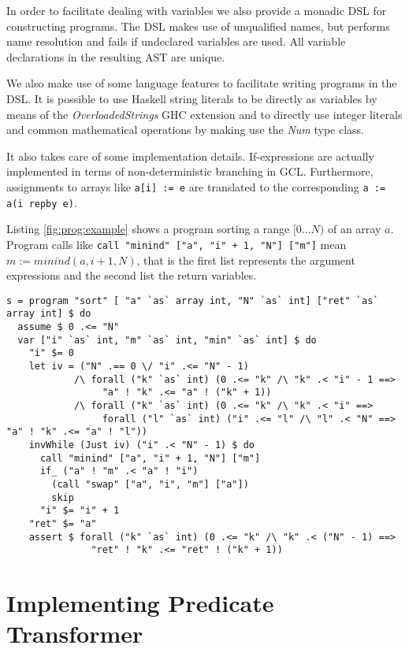 \documentclass[]{scrartcl}
\begin{document}
In order to facilitate dealing with variables we also provide a monadic DSL for constructing programs.
The DSL makes use of unqualified names, but performs name resolution and fails if undeclared variables
are used. All variable declarations in the resulting AST are unique.

We also make use of some language features to facilitate writing programs in the DSL.
It is possible to use Haskell string literals to be directly as variables by means of the
\emph{OverloadedStrings} GHC extension and to directly use integer literals and common mathematical
operations by making use the \emph{Num} type class.

It also takes care of some implementation details. If-expressions are actually implemented in terms of
non-deterministic branching in GCL. Furthermore, assignments to arrays like
\lstinline|a[i] := e| are translated to the corresponding \lstinline|a := a(i repby e)|.

Listing \ref{fig:prog:example} shows a program sorting a range $[0\ldots N)$ of an array $a$.
Program calls like \lstinline|call "minind" ["a", "i" + 1, "N"] ["m"]| mean $m := \mathit{minind}(a, i+1, N)$,
that is the first list represents the argument expressions and the second list the return variables.

\begin{lstlisting}[caption=Selection sort implemented in our DSL, label=fig:prog:example]
s = program "sort" [ "a" `as` array int, "N" `as` int] ["ret" `as` array int] $ do
  assume $ 0 .<= "N"
  var ["i" `as` int, "m" `as` int, "min" `as` int] $ do
    "i" $= 0
    let iv = ("N" .== 0 \/ "i" .<= "N" - 1)
            /\ forall ("k" `as` int) (0 .<= "k" /\ "k" .< "i" - 1 ==> 
                 "a" ! "k" .<= "a" ! ("k" + 1))
            /\ forall ("k" `as` int) (0 .<= "k" /\ "k" .< "i" ==> 
                 forall ("l" `as` int) ("i" .<= "l" /\ "l" .< "N" ==> "a" ! "k" .<= "a" ! "l"))
    invWhile (Just iv) ("i" .< "N" - 1) $ do
      call "minind" ["a", "i" + 1, "N"] ["m"]
      if_ ("a" ! "m" .< "a" ! "i")
        (call "swap" ["a", "i", "m"] ["a"])
        skip
      "i" $= "i" + 1
    "ret" $= "a"
    assert $ forall ("k" `as` int) (0 .<= "k" /\ "k" .< ("N" - 1) ==> 
               "ret" ! "k" .<= "ret" ! ("k" + 1))
\end{lstlisting}

\section{Implementing Predicate Transformer}
\end{document}
